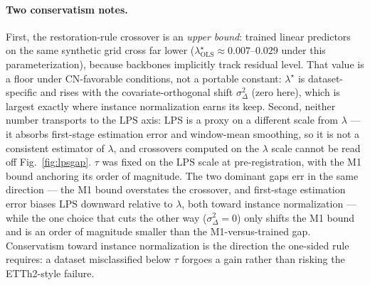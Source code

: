 \documentclass{article}
\newcommand{\lps}{\ensuremath{\mathrm{LPS}}}
\begin{document}
\paragraph{Two conservatism notes.} First, the restoration-rule crossover is
an \emph{upper bound}: trained linear predictors on the same synthetic grid
cross far lower ($\lambda^\star_{\mathrm{OLS}} \approx 0.007$--$0.029$ under
this parameterization), because backbones implicitly track residual level.
That value is a floor under CN-favorable conditions, not a portable constant:
$\lambda^\star$ is dataset-specific and rises with the covariate-orthogonal
shift $\sigma_\Delta^2$ (zero here), which is largest exactly where instance
normalization earns its keep. Second, neither number transports to the \lps{}
axis: \lps{} is a proxy on a different scale from $\lambda$ --- it absorbs
first-stage estimation error and window-mean smoothing, so it is not a
consistent estimator of $\lambda$, and crossovers computed on the $\lambda$
scale cannot be read off Fig.~\ref{fig:lpsgap}. $\tau$ was fixed on the \lps{}
scale at pre-registration, with the M1 bound anchoring its order of magnitude.
The two dominant gaps err in the same direction --- the M1 bound overstates
the crossover, and first-stage estimation error biases \lps{} downward
relative to $\lambda$, both toward instance normalization --- while the one
choice that cuts the other way ($\sigma_\Delta^2{=}0$) only shifts the M1
bound and is an order of magnitude smaller than the M1-versus-trained gap.
Conservatism toward instance normalization is the direction the one-sided
rule requires: a dataset misclassified below $\tau$ forgoes a gain rather
than risking the ETTh2-style failure.
\end{document}
